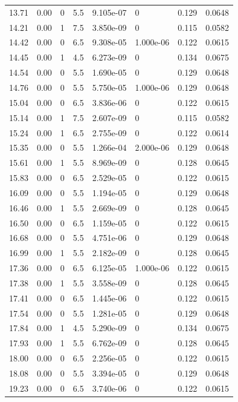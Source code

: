 \documentclass[preview]{standalone}
\begin{document}
{{{\begin{tabular}{L{1.2cm}C{1.2cm} C{0.3cm}C{0.5cm} C{1.4cm}C{1.4cm} C{1.4cm}C{1.4cm}}
  13.71  &  0.00  & 0     & 5.5 &  9.105e-07  & 0  & 0.129 &  0.0648   \\ 
  14.21  &  0.00  & 1     & 7.5 &  3.850e-09  & 0  & 0.115 &  0.0582   \\ 
  14.42  &  0.00  & 0     & 6.5 &  9.308e-05  & 1.000e-06  & 0.122 &  0.0615   \\ 
  14.45  &  0.00  & 1     & 4.5 &  6.273e-09  & 0  & 0.134 &  0.0675   \\ 
  14.54  &  0.00  & 0     & 5.5 &  1.690e-05  & 0  & 0.129 &  0.0648   \\ 
  14.76  &  0.00  & 0     & 5.5 &  5.750e-05  & 1.000e-06  & 0.129 &  0.0648   \\ 
  15.04  &  0.00  & 0     & 6.5 &  3.836e-06  & 0  & 0.122 &  0.0615   \\ 
  15.14  &  0.00  & 1     & 7.5 &  2.607e-09  & 0  & 0.115 &  0.0582   \\ 
  15.24  &  0.00  & 1     & 6.5 &  2.755e-09  & 0  & 0.122 &  0.0614   \\ 
  15.35  &  0.00  & 0     & 5.5 &  1.266e-04  & 2.000e-06  & 0.129 &  0.0648   \\ 
  15.61  &  0.00  & 1     & 5.5 &  8.969e-09  & 0  & 0.128 &  0.0645   \\ 
  15.83  &  0.00  & 0     & 6.5 &  2.529e-05  & 0  & 0.122 &  0.0615   \\ 
  16.09  &  0.00  & 0     & 5.5 &  1.194e-05  & 0  & 0.129 &  0.0648   \\ 
  16.46  &  0.00  & 1     & 5.5 &  2.669e-09  & 0  & 0.128 &  0.0645   \\ 
  16.50  &  0.00  & 0     & 6.5 &  1.159e-05  & 0  & 0.122 &  0.0615   \\ 
  16.68  &  0.00  & 0     & 5.5 &  4.751e-06  & 0  & 0.129 &  0.0648   \\ 
  16.99  &  0.00  & 1     & 5.5 &  2.182e-09  & 0  & 0.128 &  0.0645   \\ 
  17.36  &  0.00  & 0     & 6.5 &  6.125e-05  & 1.000e-06  & 0.122 &  0.0615   \\ 
  17.38  &  0.00  & 1     & 5.5 &  3.558e-09  & 0  & 0.128 &  0.0645   \\ 
  17.41  &  0.00  & 0     & 6.5 &  1.445e-06  & 0  & 0.122 &  0.0615   \\ 
  17.54  &  0.00  & 0     & 5.5 &  1.281e-05  & 0  & 0.129 &  0.0648   \\ 
  17.84  &  0.00  & 1     & 4.5 &  5.290e-09  & 0  & 0.134 &  0.0675   \\ 
  17.93  &  0.00  & 1     & 5.5 &  6.762e-09  & 0  & 0.128 &  0.0645   \\ 
  18.00  &  0.00  & 0     & 6.5 &  2.256e-05  & 0  & 0.122 &  0.0615   \\ 
  18.08  &  0.00  & 0     & 5.5 &  3.394e-05  & 0  & 0.129 &  0.0648   \\ 
  19.23  &  0.00  & 0     & 6.5 &  3.740e-06  & 0  & 0.122 &  0.0615   \\ 
\hline 
\end{tabular} 

}}}
\end{document}
